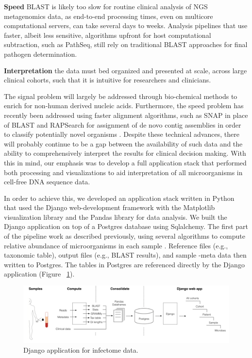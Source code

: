 \textbf{Speed} BLAST is likely too slow for routine clinical analysis of NGS metagenomics data, as end-to-end processing times, even on multicore computational servers, can take several days to weeks.  Analysis pipelines that use faster, albeit less sensitive, algorithms upfront for host computational subtraction, such as PathSeq, still rely on traditional BLAST approaches for final pathogen determination.  

\textbf{Interpretation} the data must bed organized and presented at scale, across large clinical cohorts, such that it is intuitive for researchers and clinicians.

The signal problem will largely be addressed through bio-chemical methods to enrich for non-human derived nucleic acids. Furthermore, the speed problem has recently been addressed using faster alignment algorithms, such as SNAP in place of BLAST and RAPSearch for assignment of de novo contig assemblies in order to classify potentially novel organisms \cite{Naccache:2014gk}. Despite these technical advances, there will probably continue to be a gap between the availability of such data and the ability to comprehensively interpret the results for clinical decision making. With this in mind, our emphasis was to develop a full application stack that performed both processing and visualizations to aid interpretation of all microorganisms in cell-free DNA sequence data. 

In order to achieve this, we developed an application stack written in Python that used the Django web-development framework with the Matplotlib visualization library \cite{Hunter:2007ux} and the Pandas library for data analysis. We built the Django application on top of a Postgres database using Sqlalchemy. The first part of the pipeline work as described previously, using several algorithms to compute relative abundance of microorganisms in each sample \cite{DeVlaminck:2013hl}. Reference files (e.g., taxonomic table), output files (e.g., BLAST results), and sample -meta data then written to Postgres. The tables in Postgres are referenced directly by the Django application (Figure ~\ref{fig:Fig4}).

\begin{figure}
\center\includegraphics[width=150mm,scale=0.5]{Figures/Fig4}
\caption{Django application for infectome data.}
\label{fig:Fig4}
\end{figure}

